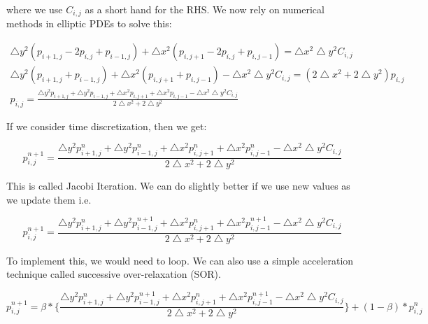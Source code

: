 \documentclass[12pt]{article}
\begin{document}
where we use $C_{i,j}$ as a short hand for the RHS. We now rely on numerical methods in elliptic PDEs to solve this:

\begin{align}
    \bigtriangleup y^2 (p_{i+1,j}-2p_{i,j}+p_{i-1,j}) + \bigtriangleup x^2 (p_{i,j+1}-2p_{i,j}+p_{i,j-1}) = \bigtriangleup x^2 \bigtriangleup y^2 C_{i,j} \\
    \bigtriangleup y^2 (p_{i+1,j} + p_{i-1,j}) + \bigtriangleup x^2 (p_{i,j+1} + p_{i, j-1}) - \bigtriangleup x^2 \bigtriangleup y^2  C_{i,j} = (2\bigtriangleup x^2 + 2\bigtriangleup y^2)p_{i,j} \\
    p_{i,j} = \frac{\bigtriangleup y^2 p_{i+1,j} + \bigtriangleup y^2 p_{i-1,j} + \bigtriangleup x^2  p_{i,j+1} + \bigtriangleup x^2 p_{i, j-1} - \bigtriangleup x^2 \bigtriangleup y^2  C_{i,j}}{2\bigtriangleup x^2 + 2\bigtriangleup y^2}
\end{align}

If we consider time discretization, then we get:

\begin{equation}
    p_{i,j}^{n+1} = \frac{\bigtriangleup y^2 p^n_{i+1,j} + \bigtriangleup y^2 p^n_{i-1,j} + \bigtriangleup x^2  p^n_{i,j+1} + \bigtriangleup x^2 p^n_{i, j-1} - \bigtriangleup x^2 \bigtriangleup y^2  C_{i,j}}{2\bigtriangleup x^2 + 2\bigtriangleup y^2}
\end{equation}

This is called Jacobi Iteration. We can do slightly better if we use new values as we update them i.e.

\begin{equation}
    p_{i,j}^{n+1} = \frac{\bigtriangleup y^2 p^n_{i+1,j} + \bigtriangleup y^2 p^{n+1}_{i-1,j} + \bigtriangleup x^2  p^n_{i,j+1} + \bigtriangleup x^2 p^{n+1}_{i, j-1} - \bigtriangleup x^2 \bigtriangleup y^2  C_{i,j}}{2\bigtriangleup x^2 + 2\bigtriangleup y^2}
\end{equation}

To implement this, we would need to loop. We can also use a simple acceleration technique called successive over-relaxation (SOR).

\begin{equation}
    p_{i,j}^{n+1} = \beta * \{\frac{\bigtriangleup y^2 p^n_{i+1,j} + \bigtriangleup y^2 p^{n+1}_{i-1,j} + \bigtriangleup x^2  p^n_{i,j+1} + \bigtriangleup x^2 p^{n+1}_{i, j-1} - \bigtriangleup x^2 \bigtriangleup y^2  C_{i,j}}{2\bigtriangleup x^2 + 2\bigtriangleup y^2}\} + (1-\beta) * p^n_{i,j}
\end{equation}
\end{document}
